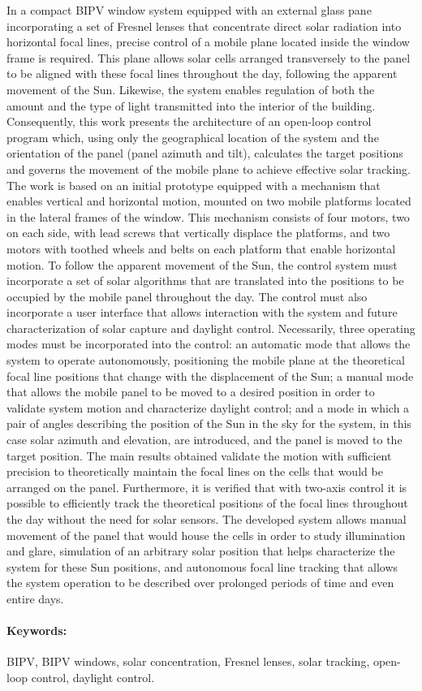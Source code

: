 In a compact BIPV window system equipped with an external glass pane incorporating a set of Fresnel lenses that concentrate direct solar radiation into horizontal focal lines, precise control of a mobile plane located inside the window frame is required. This plane allows solar cells arranged transversely to the panel to be aligned with these focal lines throughout the day, following the apparent movement of the Sun. Likewise, the system enables regulation of both the amount and the type of light transmitted into the interior of the building.
Consequently, this work presents the architecture of an open-loop control program which, using only the geographical location of the system and the orientation of the panel (panel azimuth and tilt), calculates the target positions and governs the movement of the mobile plane to achieve effective solar tracking.
The work is based on an initial prototype equipped with a mechanism that enables vertical and horizontal motion, mounted on two mobile platforms located in the lateral frames of the window. This mechanism consists of four motors, two on each side, with lead screws that vertically displace the platforms, and two motors with toothed wheels and belts on each platform that enable horizontal motion. To follow the apparent movement of the Sun, the control system must incorporate a set of solar algorithms that are translated into the positions to be occupied by the mobile panel throughout the day. The control must also incorporate a user interface that allows interaction with the system and future characterization of solar capture and daylight control. Necessarily, three operating modes must be incorporated into the control: an automatic mode that allows the system to operate autonomously, positioning the mobile plane at the theoretical focal line positions that change with the displacement of the Sun; a manual mode that allows the mobile panel to be moved to a desired position in order to validate system motion and characterize daylight control; and a mode in which a pair of angles describing the position of the Sun in the sky for the system, in this case solar azimuth and elevation, are introduced, and the panel is moved to the target position.
The main results obtained validate the motion with sufficient precision to theoretically maintain the focal lines on the cells that would be arranged on the panel. Furthermore, it is verified that with two-axis control it is possible to efficiently track the theoretical positions of the focal lines throughout the day without the need for solar sensors.
The developed system allows manual movement of the panel that would house the cells in order to study illumination and glare, simulation of an arbitrary solar position that helps characterize the system for these Sun positions, and autonomous focal line tracking that allows the system operation to be described over prolonged periods of time and even entire days.


\paragraph{Keywords:} BIPV, BIPV windows, solar concentration, Fresnel lenses, solar tracking, open-loop control, daylight control.